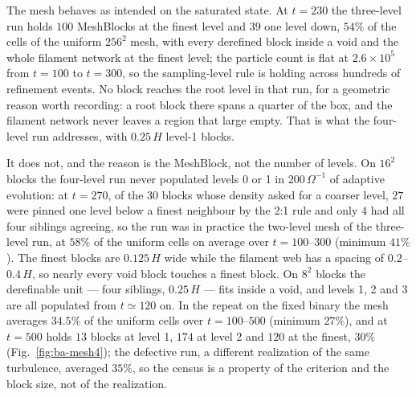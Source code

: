 \documentclass[11pt]{article}
\begin{document}
The mesh behaves as intended on the saturated state. At $t = 230$ the three-level run
holds $100$ MeshBlocks at the finest level and $39$ one level down, $54\%$ of the cells of
the uniform $256^2$ mesh, with every derefined block inside a void and the whole filament
network at the finest level; the particle count is flat at $2.6\times10^5$ from $t = 100$
to $t = 300$, so the sampling-level rule is holding across hundreds of refinement events.
No block reaches the root level in that run, for a geometric reason worth recording: a
root block there spans a quarter of the box, and the filament network never leaves a
region that large empty. That is what the four-level run addresses, with $0.25\,H$
level-1 blocks.

It does not, and the reason is the MeshBlock, not the number of levels. On $16^2$ blocks
the four-level run never populated levels 0 or 1 in $200\,\Omega^{-1}$ of adaptive
evolution: at $t = 270$, of the $30$ blocks whose density asked for a coarser level, $27$
were pinned one level below a finest neighbour by the 2:1 rule and only $4$ had all four
siblings agreeing, so the run was in practice the two-level mesh of the three-level run,
at $58\%$ of the uniform cells on average over $t = 100$--$300$ (minimum $41\%$). The
finest blocks are $0.125\,H$ wide while the filament web has a spacing of
$0.2$--$0.4\,H$, so nearly every void block touches a finest block. On $8^2$ blocks the
derefinable unit --- four siblings, $0.25\,H$ --- fits inside a void, and levels 1, 2
and 3 are all populated from $t \simeq 120$ on. In the repeat on the fixed binary the
mesh averages $34.5\%$ of the uniform cells over $t = 100$--$500$ (minimum $27\%$), and at
$t = 500$ holds $13$ blocks at level 1, $174$ at level 2 and $120$ at the finest, $30\%$
(Fig.~\ref{fig:ba-mesh4}); the defective run, a different realization of the same
turbulence, averaged $35\%$, so the census is a property of the criterion and the block
size, not of the realization.
\end{document}
